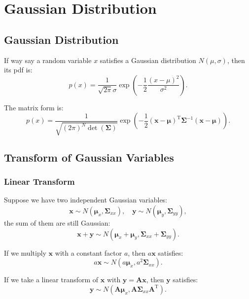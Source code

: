 \chapter{Gaussian Distribution}
\label{cpt:app-A}
\section{Gaussian Distribution}
If way say a random variable $x$ satisfies a Gaussian distribution $N(\mu, \sigma)$, then its pdf is:
\begin{equation}
p\left( x \right) = \frac{1}{{\sqrt {2\pi } \sigma }}\exp \left( { - \frac{1}{2}\frac{{{{\left( {x - \mu } \right)}^2}}}{{{\sigma ^2}}}} \right).
\end{equation}

The matrix form is:
\begin{equation}
p\left( x \right) = \frac{1}{{\sqrt {(2\pi)^N  \det \left( \boldsymbol{\Sigma } \right) }}}\exp \left( { - \frac{1}{2}{{\left( {\mathbf{x} - \boldsymbol{\mu} } \right)}^\mathrm{T}}{\boldsymbol{\Sigma} ^{ - 1}}\left( {\mathbf{x} - \boldsymbol{\mu} } \right)} \right).
\end{equation}

\section{Transform of Gaussian Variables}
\subsection{Linear Transform}
Suppose we have two independent Gaussian variables:
\[
\mathbf{x} \sim N( \boldsymbol{\mu}_x, \boldsymbol{\Sigma}_{xx} ), \quad \mathbf{y} \sim N( \boldsymbol{\mu}_y, \boldsymbol{\Sigma}_{yy} ),
\]
the sum of them are still Gaussian: 
\begin{equation}
\mathbf{x}+\mathbf{y} \sim N( \boldsymbol{\mu}_x + \boldsymbol{\mu}_y, \boldsymbol{\Sigma}_{xx} + \boldsymbol{\Sigma}_{yy}).
\end{equation}

If we multiply $\mathbf{x}$ with a constant factor $a$, then $a \mathbf{x}$ satisfies:
\begin{equation}
a\mathbf{x} \sim N( a \boldsymbol{\mu}_x, a^2 \boldsymbol{\Sigma}_{xx}).
\end{equation}

If we take a linear transform of $\mathbf{x}$ with $\mathbf{y} = \mathbf{A} \mathbf{x}$, then $\mathbf{y}$ satisfies:
\begin{equation}
\mathbf{y} \sim N( \mathbf{A} \boldsymbol{\mu}_x, \mathbf{A} \boldsymbol{\Sigma}_{xx} \mathbf{A}^\mathrm{T}).
\end{equation}

